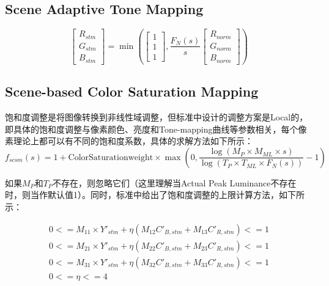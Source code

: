 \documentclass{article}
\begin{document}
\subsection{Scene Adaptive Tone Mapping}
\begin{equation}
\left[ \begin{array}{c} R_{stm} \\ G_{stm} \\ B_{stm} \end{array} \right] = \min(\left[ \begin{array}{c} 1 \\ 1 \\ 1 \end{array}\right],\frac{F_N(s)}{s}\left[\begin{array}{c} R_{norm} \\ G_{norm} \\ B_{norm} \end{array} \right])
\end{equation}


\subsection{Scene-based Color Saturation Mapping}
饱和度调整是将图像转换到非线性域调整，但标准中设计的调整方案是Local的，即具体的饱和度调整与像素颜色、亮度和Tone-mapping曲线等参数相关，每个像素理论上都可以有不同的饱和度系数，具体的求解方法如下所示：
\begin{equation} f_{scsm}(s) = 1 + \mbox{ColorSaturationweight} \times \max(0, \frac{\log(M_P \times M_{ML} \times s)}{\log(T_P \times T_{ML} \times F_N(s))}-1) \end{equation}

如果$M_P$和$T_P$不存在，则忽略它们（这里理解当Actual Peak Luminance不存在时，则当作默认值1）。同时，标准中给出了饱和度调整的上限计算方法，如下所示：

\begin{equation}
\begin{array}{c} 
    0 <= M_{11} \times Y'_{stm} + \eta (M_{12}C'_{B,stm} + M_{13}C'_{R,stm}) <= 1\\
    0 <= M_{21} \times Y'_{stm} + \eta (M_{22}C'_{B,stm} + M_{23}C'_{R,stm}) <= 1 \\
    0 <= M_{31} \times Y'_{stm} + \eta (M_{32}C'_{B,stm} + M_{33}C'_{R,stm}) <= 1 \\
    0 <= \eta <= 4
\end{array}
\end{equation}
\end{document}
